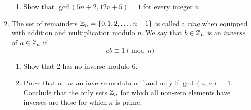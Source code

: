 \begin{exercises}{}{}
\begin{enumerate}
\begin{enumerate}
	  	\item Show that $\gcd(5n+2,12n+5)=1$ for every integer $n$.
	  \end{enumerate}
	
	
	  \item\label{exs:ringintro} The set of remainders $\mathbb{Z}_n=\{0,1,2,\ldots,n-1\}$ is called a \emph{ring} when equipped with addition and multiplication modulo $n$. We say that $b\in\mathbb{Z}_n$ is an \emph{inverse} of $a\in\mathbb{Z}_n$ if
		\[
			ab\equiv 1\pmod n
		\]
		\begin{enumerate}
		  \item Show that 2 has no inverse modulo 6.
		  \item Prove that $a$ has an inverse modulo $n$ if and only if $\gcd(a,n)=1$. Conclude that the only sets $\mathbb{Z}_n$ for which all non-zero elements have inverses are those for which $n$ is prime.	  
		\end{enumerate}
			  
	\end{enumerate}

\end{exercises}

